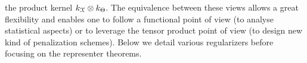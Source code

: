 the product kernel $k_{\mathcal{X}} \otimes k_{\Theta}$. The equivalence between these
views allows a great flexibility and enables one to follow a functional point
of view (to analyse statistical aspects) or to leverage the tensor product
point of view (to design new kind of penalization schemes). Below we detail
various regularizers before focusing on the representer theorems.\par
%
